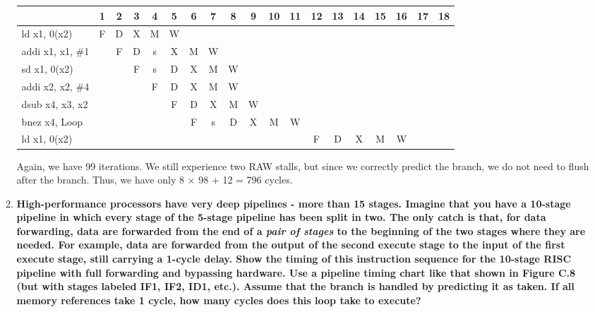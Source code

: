 \begin{enumerate}
\begin{enumerate}
        \begin{center}
            \begin{tabular}{|l|*{18}{c|}}
                \hline
                \multicolumn{1}{|c|}{} & 1 & 2 & 3 & 4 & 5 & 6 & 7 & 8 & 9 & 10 & 11 & 12 & 13 & 14 & 15 & 16 & 17 & 18 \\
                \hline
                ld x1, 0(x2) & F & D & X & M & W & & & & & & & & & & & & & \\
                \hline
                addi x1, x1, \#1 & & F & D & s & X & M & W & & & & & & & & & & & \\
                \hline
                sd x1, 0(x2) & & & F & s & D & X & M & W & & & & & & & & & & \\
                \hline
                addi x2, x2, \#4 & & & & F & D & X & M & W & & & & & & & & & & \\
                \hline
                dsub x4, x3, x2 & & & & & F & D & X & M & W & & & & & & & & & \\
                \hline
                bnez x4, Loop & & & & & & F & s & D & X & M & W & & & & & & & \\
                \hline
                ld x1, 0(x2) & & & & & & & & & & & & F & D & X & M & W & & \\
                \hline
            \end{tabular}
        \end{center}
        
        Again, we have 99 iterations. We still experience two RAW stalls, but since we correctly predict the branch, we do not need to flush after the branch. Thus, we have only 8 × 98 + 12 = 796 cycles.

        \item \textbf{High-performance processors have very deep pipelines - more than 15 stages. Imagine that you have a 10-stage pipeline in which every stage of the 5-stage pipeline has been split in two. The only catch is that, for data forwarding, data are forwarded from the end of a \textit{pair of stages} to the beginning of the two stages where they are needed. For example, data are forwarded from the output of the second execute stage to the input of the first execute stage, still carrying a 1-cycle delay. Show the timing of this instruction sequence for the 10-stage RISC pipeline with full forwarding and bypassing hardware. Use a pipeline timing chart like that shown in Figure C.8 (but with stages labeled IF1, IF2, ID1, etc.). Assume that the branch is handled by predicting it as taken. If all memory references take 1 cycle, how many cycles does this loop take to execute?}
        

\end{enumerate}
\end{enumerate}
